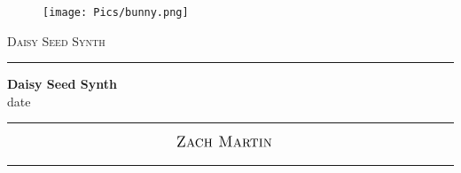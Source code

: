 \begin{titlepage}
\begin{center}


\begin{figure}[ht]
    \centering
   {{\texttt{[image: Pics/bunny.png]} }}%
\end{figure}

\textsc{\LARGE 
Daisy Seed Synth}\\[0.4cm] 
\hrule
\vspace{0.3cm}
{\huge\bfseries Daisy Seed Synth\\[0.1cm]}%
{\large date\\[0.1cm]} 
\hrule
\vspace{0.05cm}
\begin{align*}%
    &{\textsc{\large Zach Martin}}
\end{align*}
\hrule
\vspace{0.05cm}
\begin{abstract}
This report outlines the design and implementation of a modular synthesizer firmware developed for the Daisy Seed platform. The system supports multiple user interaction modes, dynamic parameter mapping via potentiometers, and real-time audio synthesis with oscillator blending, filter modulation, envelope shaping, and low-frequency oscillation (LFO).
\end{abstract}
\end{center}
\end{titlepage}



